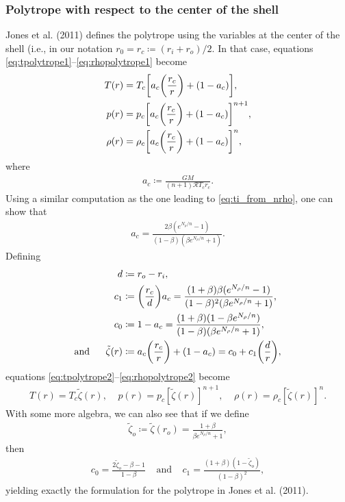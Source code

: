 \documentclass[12pt]{article} %
\newcommand{\andd}{\text{and}\ \ \ \ \ }
\newcommand{\tz}{\tilde{\zeta}}
\begin{document}
\subsubsection{Polytrope with respect to the center of the shell}
Jones et al. (2011) defines the polytrope using the variables at the center of the shell (i.e., in our notation $r_0=r_c\coloneqq(r_i+r_o)/2$. In that case, equations  \eqref{eq:tpolytrope1}--\eqref{eq:rhopolytrope1} become
\begin{align}
	T(r) &= T_c\bigg{[}a_c\bigg{(}\frac{r_c}{r}\bigg{)} + (1 - a_c)\bigg{]},\label{eq:tpolytrope2}\\
	p(r) &= p_c\bigg{[}a_c\bigg{(}\frac{r_c}{r}\bigg{)} + (1 - a_c)\bigg{]}^{n+1},\label{eq:ppolytrope2}\\
	\rho(r) &= \rho_c\bigg{[}a_c\bigg{(}\frac{r_c}{r}\bigg{)} + (1 - a_c)\bigg{]}^n,\label{eq:rhopolytrope2}
\end{align} 
where 
\begin{align}
a_c \coloneqq \frac{GM}{(n+1)\mathcal{R}T_c r_c}.
\label{def:ac}
\end{align}
Using a similar computation as the one leading to \eqref{eq:ti_from_nrho}, one can show that 
\begin{align}
a_c = \frac{2\beta(e^{N_\rho/n}-1)}{(1-\beta)(\beta e^{N_\rho/n} + 1)}.
\label{eq:ac_fromn}
\end{align}
Defining 
\begin{align}
d&\coloneqq r_o-r_i,\label{def:d}\\
c_1&\coloneqq \bigg{(}\frac{r_c}{d}\bigg{)}a_c = \frac{(1+\beta)\beta(e^{N_\rho/n}-1)}{(1-\beta)^2(\beta e^{N_\rho/n} + 1)},\label{def:c1}\\
c_0&\coloneqq 1-a_c = \frac{(1+\beta)(1-\beta e^{N_\rho/n})}{(1-\beta)(\beta e^{N_\rho/n} + 1)}, \label{def:c0}\\
\andd \tz(r) &\coloneqq a_c\bigg{(}\frac{r_c}{r}\bigg{)} + (1-a_c) = c_0 + c_1\bigg{(}\frac{d}{r}\bigg{)},\label{def:tildezeta}
\end{align}
equations \eqref{eq:tpolytrope2}--\eqref{eq:rhopolytrope2} become
\begin{align}
T(r)=T_c\tz(r),\ \ \ \ \ p(r)=p_c[\tz(r)]^{n+1},\ \ \ \ \ \rho(r)=\rho_c[\tz(r)]^n. 
\label{eq:polytrope3}
\end{align}
With some more algebra, we can also see that if we define
\begin{align}
\tz_o \coloneqq \tz(r_o) = \frac{1+\beta}{\beta e^{N_\rho/n} + 1}, 
\end{align}
then 
\begin{align}
c_0 = \frac{2\tz_o - \beta - 1}{1-\beta} \ \ \ \ \ \andd c_1 = \frac{(1+\beta)(1-\tz_o)}{(1-\beta)^2},
\label{eq:c01_from_zeta0}
\end{align}
yielding exactly the formulation for the polytrope in Jones et al. (2011). 
\end{document}
